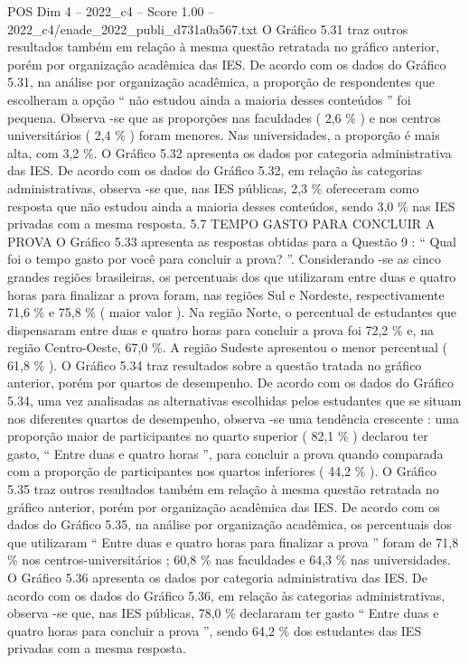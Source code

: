 \begin{textsample}{POS Dim 4 – 2022\_c4 – Score 1.00 – 2022\_c4/enade\_2022\_publi\_d731a0a567.txt}
O Gráfico 5.31 traz outros resultados também em relação à mesma questão retratada no gráfico anterior, porém por organização acadêmica das IES.
De acordo com os dados do Gráfico 5.31, na análise por organização acadêmica, a proporção de respondentes que escolheram a opção “ não estudou ainda a maioria desses conteúdos ” foi pequena.
Observa -se que as proporções nas faculdades ( 2,6 \% ) e nos centros universitários ( 2,4 \% ) foram menores.
Nas universidades, a proporção é mais alta, com 3,2 \%.
O Gráfico 5.32 apresenta os dados por categoria administrativa das IES.
De acordo com os dados do Gráfico 5.32, em relação às categorias administrativas, observa -se que, nas IES públicas, 2,3 \% ofereceram como resposta que não estudou ainda a maioria desses conteúdos, sendo 3,0 \% nas IES privadas com a mesma resposta. 5.7 TEMPO GASTO PARA CONCLUIR A PROVA O Gráfico 5.33 apresenta as respostas obtidas para a Questão 9 : “ Qual foi o tempo gasto por você para concluir a prova? ”.
Considerando -se as cinco grandes regiões brasileiras, os percentuais dos que utilizaram entre duas e quatro horas para finalizar a prova foram, nas regiões Sul e Nordeste, respectivamente 71,6 \% e 75,8 \% ( maior valor ).
Na região Norte, o percentual de estudantes que dispensaram entre duas e quatro horas para concluir a prova foi 72,2 \% e, na região Centro-Oeste, 67,0 \%.
A região Sudeste apresentou o menor percentual ( 61,8 \% ).
O Gráfico 5.34 traz resultados sobre a questão tratada no gráfico anterior, porém por quartos de desempenho.
De acordo com os dados do Gráfico 5.34, uma vez analisadas as alternativas escolhidas pelos estudantes que se situam nos diferentes quartos de desempenho, observa -se uma tendência crescente : uma proporção maior de participantes no quarto superior ( 82,1 \% ) declarou ter gasto, “ Entre duas e quatro horas ”, para concluir a prova quando comparada com a proporção de participantes nos quartos inferiores ( 44,2 \% ).
O Gráfico 5.35 traz outros resultados também em relação à mesma questão retratada no gráfico anterior, porém por organização acadêmica das IES.
De acordo com os dados do Gráfico 5.35, na análise por organização acadêmica, os percentuais dos que utilizaram “ Entre duas e quatro horas para finalizar a prova ” foram de 71,8 \% nos centros-universitários ; 60,8 \% nas faculdades e 64,3 \% nas universidades.
O Gráfico 5.36 apresenta os dados por categoria administrativa das IES.
De acordo com os dados do Gráfico 5.36, em relação às categorias administrativas, observa -se que, nas IES públicas, 78,0 \% declararam ter gasto “ Entre duas e quatro horas para concluir a prova ”, sendo 64,2 \% dos estudantes das IES privadas com a mesma resposta.

\end{textsample}
